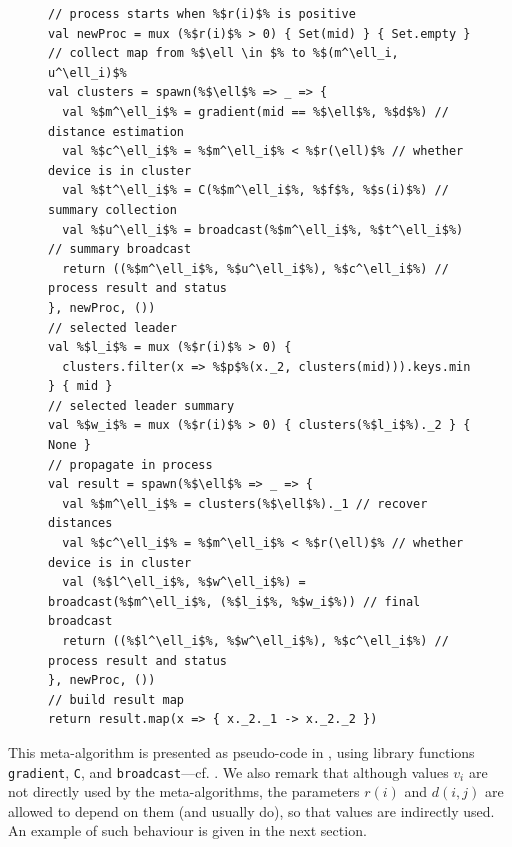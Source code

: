 \begin{figure}
\begin{lstlisting}[escapechar=\%, caption=\scafi{} pseudo-code of the clustering meta-algorithm, label={fig:pseudocode}]
// process starts when %$r(i)$% is positive
val newProc = mux (%$r(i)$% > 0) { Set(mid) } { Set.empty }
// collect map from %$\ell \in $% to %$(m^\ell_i, u^\ell_i)$%
val clusters = spawn(%$\ell$% => _ => {
  val %$m^\ell_i$% = gradient(mid == %$\ell$%, %$d$%) // distance estimation
  val %$c^\ell_i$% = %$m^\ell_i$% < %$r(\ell)$% // whether device is in cluster
  val %$t^\ell_i$% = C(%$m^\ell_i$%, %$f$%, %$s(i)$%) // summary collection
  val %$u^\ell_i$% = broadcast(%$m^\ell_i$%, %$t^\ell_i$%) // summary broadcast
  return ((%$m^\ell_i$%, %$u^\ell_i$%), %$c^\ell_i$%) // process result and status
}, newProc, ())
// selected leader
val %$l_i$% = mux (%$r(i)$% > 0) {
  clusters.filter(x => %$p$%(x._2, clusters(mid))).keys.min
} { mid }
// selected leader summary
val %$w_i$% = mux (%$r(i)$% > 0) { clusters(%$l_i$%)._2 } { None }
// propagate in process
val result = spawn(%$\ell$% => _ => {
  val %$m^\ell_i$% = clusters(%$\ell$%)._1 // recover distances
  val %$c^\ell_i$% = %$m^\ell_i$% < %$r(\ell)$% // whether device is in cluster
  val (%$l^\ell_i$%, %$w^\ell_i$%) = broadcast(%$m^\ell_i$%, (%$l_i$%, %$w_i$%)) // final broadcast
  return ((%$l^\ell_i$%, %$w^\ell_i$%), %$c^\ell_i$%) // process result and status
}, newProc, ())
// build result map
return result.map(x => { x._2._1 -> x._2._2 })
\end{lstlisting}
\end{figure}

This meta-algorithm is presented as \scafi{} pseudo-code in , using \scafi{} library functions \lstinline|gradient|, \lstinline|C|, and \lstinline|broadcast|---cf. .
%
%
 We also remark that although values $v_i$ are not directly used by the meta-algorithms, the parameters $r(i)$ and $d(i,j)$ are allowed to depend on them (and usually do),
 so that values are indirectly used. An example of such behaviour is given in the next section.


